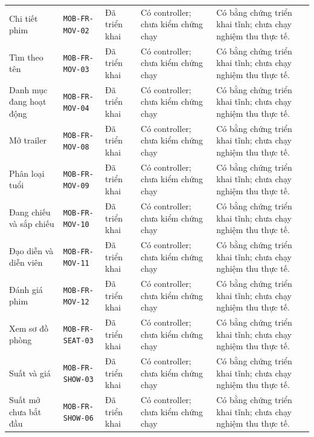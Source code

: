 \begin{longtable}{@{}P{0.19000\SRSWidth}P{0.18000\SRSWidth}P{0.15000\SRSWidth}P{0.20000\SRSWidth}P{0.28000\SRSWidth}@{}}
Chi tiết phim & \texttt{MOB-\allowbreak{}FR-\allowbreak{}MOV-\allowbreak{}02} & Đã triển khai & Có controller; chưa kiểm chứng chạy & Có bằng chứng triển khai tĩnh; chưa chạy nghiệm thu thực tế. \\[3pt]
Tìm theo tên & \texttt{MOB-\allowbreak{}FR-\allowbreak{}MOV-\allowbreak{}03} & Đã triển khai & Có controller; chưa kiểm chứng chạy & Có bằng chứng triển khai tĩnh; chưa chạy nghiệm thu thực tế. \\[3pt]
Danh mục đang hoạt động & \texttt{MOB-\allowbreak{}FR-\allowbreak{}MOV-\allowbreak{}04} & Đã triển khai & Có controller; chưa kiểm chứng chạy & Có bằng chứng triển khai tĩnh; chưa chạy nghiệm thu thực tế. \\[3pt]
Mở trailer & \texttt{MOB-\allowbreak{}FR-\allowbreak{}MOV-\allowbreak{}08} & Đã triển khai & Có controller; chưa kiểm chứng chạy & Có bằng chứng triển khai tĩnh; chưa chạy nghiệm thu thực tế. \\[3pt]
Phân loại tuổi & \texttt{MOB-\allowbreak{}FR-\allowbreak{}MOV-\allowbreak{}09} & Đã triển khai & Có controller; chưa kiểm chứng chạy & Có bằng chứng triển khai tĩnh; chưa chạy nghiệm thu thực tế. \\[3pt]
Đang chiếu và sắp chiếu & \texttt{MOB-\allowbreak{}FR-\allowbreak{}MOV-\allowbreak{}10} & Đã triển khai & Có controller; chưa kiểm chứng chạy & Có bằng chứng triển khai tĩnh; chưa chạy nghiệm thu thực tế. \\[3pt]
Đạo diễn và diễn viên & \texttt{MOB-\allowbreak{}FR-\allowbreak{}MOV-\allowbreak{}11} & Đã triển khai & Có controller; chưa kiểm chứng chạy & Có bằng chứng triển khai tĩnh; chưa chạy nghiệm thu thực tế. \\[3pt]
Đánh giá phim & \texttt{MOB-\allowbreak{}FR-\allowbreak{}MOV-\allowbreak{}12} & Đã triển khai & Có controller; chưa kiểm chứng chạy & Có bằng chứng triển khai tĩnh; chưa chạy nghiệm thu thực tế. \\[3pt]
Xem sơ đồ phòng & \texttt{MOB-\allowbreak{}FR-\allowbreak{}SEAT-\allowbreak{}03} & Đã triển khai & Có controller; chưa kiểm chứng chạy & Có bằng chứng triển khai tĩnh; chưa chạy nghiệm thu thực tế. \\[3pt]
Suất và giá & \texttt{MOB-\allowbreak{}FR-\allowbreak{}SHOW-\allowbreak{}03} & Đã triển khai & Có controller; chưa kiểm chứng chạy & Có bằng chứng triển khai tĩnh; chưa chạy nghiệm thu thực tế. \\[3pt]
Suất mở chưa bắt đầu & \texttt{MOB-\allowbreak{}FR-\allowbreak{}SHOW-\allowbreak{}06} & Đã triển khai & Có controller; chưa kiểm chứng chạy & Có bằng chứng triển khai tĩnh; chưa chạy nghiệm thu thực tế. \\[3pt]

\end{longtable}
